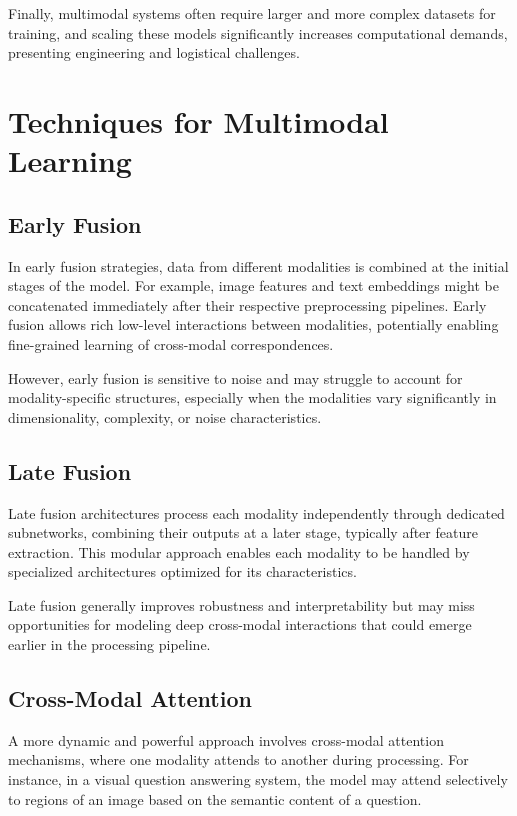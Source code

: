 \documentclass[openany]{book}
\begin{document}
Finally, multimodal systems often require larger and more complex datasets for 
training, and scaling these models significantly increases computational demands, 
presenting engineering and logistical challenges.

\section{Techniques for Multimodal Learning}

\subsection{Early Fusion}

In early fusion strategies, data from different modalities is combined at the 
initial stages of the model. For example, image features and text embeddings might 
be concatenated immediately after their respective preprocessing pipelines. Early 
fusion allows rich low-level interactions between modalities, potentially enabling 
fine-grained learning of cross-modal correspondences.

However, early fusion is sensitive to noise and may struggle to account for 
modality-specific structures, especially when the modalities vary significantly in 
dimensionality, complexity, or noise characteristics.

\subsection{Late Fusion}

Late fusion architectures process each modality independently through dedicated 
subnetworks, combining their outputs at a later stage, typically after feature 
extraction. This modular approach enables each modality to be handled by 
specialized architectures optimized for its characteristics.

Late fusion generally improves robustness and interpretability but may miss 
opportunities for modeling deep cross-modal interactions that could emerge earlier 
in the processing pipeline.

\subsection{Cross-Modal Attention}

A more dynamic and powerful approach involves cross-modal attention mechanisms, 
where one modality attends to another during processing. For instance, in a visual 
question answering system, the model may attend selectively to regions of an image 
based on the semantic content of a question.
\end{document}
